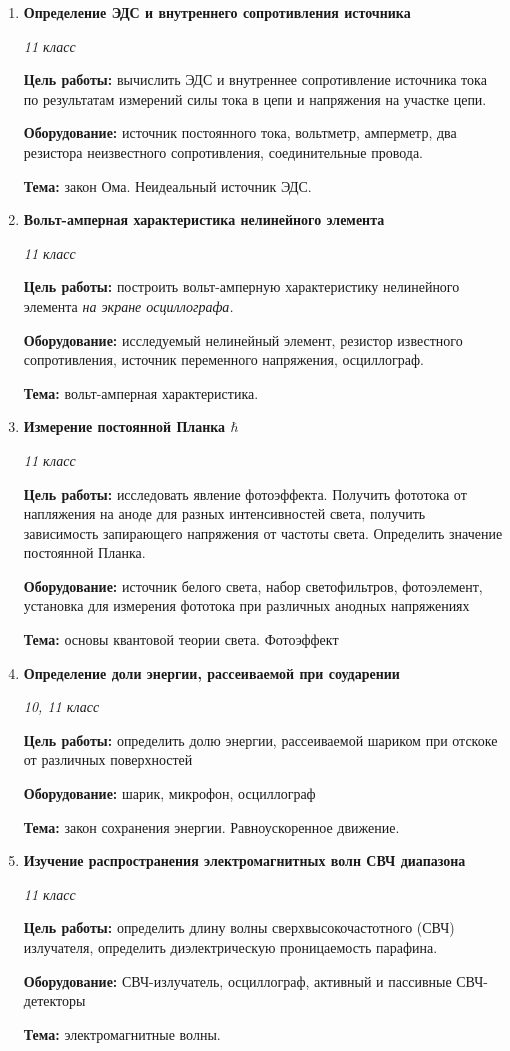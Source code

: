 \documentclass[a4paper,10pt]{article}
\newcommand{\labtitle}[5]{
	\textbf{#2}\par
	\textit{#1 класс}\par
	\textbf{Цель работы:} #3\par
	\textbf{Оборудование:} #4\par
	\textbf{Тема:} #5
}
\begin{document}
\begin{enumerate}
		{11}
		{Жесткость пружины}
		{Экспериментально проверить зависимость периода колебания пружинного маятника от массы груза и жёсткости пружины.}
		{штатив, набор грузов, пружины, секундомер, линейка.}
		{колебания. Пружинный маятник.}
	\item \labtitle
		{11}
		{Определение ЭДС и внутреннего сопротивления источника}
		{вычислить ЭДС и внутреннее сопротивление источника тока по результатам измерений силы тока в цепи и напряжения на участке цепи.}
		{источник постоянного тока, вольтметр, амперметр, два резистора неизвестного сопротивления, соединительные провода.}
		{закон Ома. Неидеальный источник ЭДС.}
	\item \labtitle
		{11}
		{Вольт-амперная характеристика нелинейного элемента}
		{построить вольт-амперную характеристику нелинейного элемента \textit{на экране осциллографа.}}
		{исследуемый нелинейный элемент, резистор известного сопротивления, источник переменного напряжения, осциллограф.}
		{вольт-амперная характеристика. }
	\item \labtitle
		{11}
		{Измерение постоянной Планка $\hbar$}
		{исследовать явление фотоэффекта. Получить фототока от напляжения на аноде для разных интенсивностей света, получить зависимость запирающего напряжения от частоты света. Определить значение постоянной Планка.}
		{источник белого света, набор светофильтров, фотоэлемент, установка для измерения фототока при различных анодных напряжениях}
		{основы квантовой теории света. Фотоэффект}
	\item \labtitle
		{10, 11}
		{Определение доли энергии, рассеиваемой при соударении}
		{определить долю энергии, рассеиваемой шариком при отскоке от различных поверхностей}
		{шарик, микрофон, осциллограф}
		{закон сохранения энергии. Равноускоренное движение.}
	\item \labtitle
		{11}
		{Изучение распространения электромагнитных волн СВЧ диапазона}
		{определить длину волны сверхвысокочастотного (СВЧ) излучателя, определить диэлектрическую проницаемость парафина.}
		{СВЧ-излучатель, осциллограф, активный и пассивные СВЧ-детекторы}
		{электромагнитные волны.}

\end{enumerate}
\end{document}
